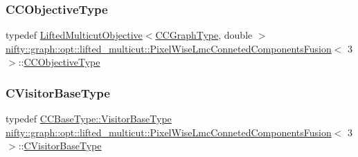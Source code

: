 \subsubsection{\texorpdfstring{C\+C\+Objective\+Type}{CCObjectiveType}}
{\footnotesize\ttfamily typedef \hyperlink{classnifty_1_1graph_1_1opt_1_1lifted__multicut_1_1LiftedMulticutObjective}{Lifted\+Multicut\+Objective}$<$\hyperlink{classnifty_1_1graph_1_1opt_1_1lifted__multicut_1_1PixelWiseLmcConnetedComponentsFusion_3_013_01_4_abbfd6800c04cc256d689973355268452}{C\+C\+Graph\+Type}, double $>$ \hyperlink{classnifty_1_1graph_1_1opt_1_1lifted__multicut_1_1PixelWiseLmcConnetedComponentsFusion}{nifty\+::graph\+::opt\+::lifted\+\_\+multicut\+::\+Pixel\+Wise\+Lmc\+Conneted\+Components\+Fusion}$<$ 3 $>$\+::\hyperlink{classnifty_1_1graph_1_1opt_1_1lifted__multicut_1_1PixelWiseLmcConnetedComponentsFusion_3_013_01_4_a0373c065e49f38aceda0c6f950735270}{C\+C\+Objective\+Type}}

\mbox{\label{classnifty_1_1graph_1_1opt_1_1lifted__multicut_1_1PixelWiseLmcConnetedComponentsFusion_3_013_01_4_a0a547cb867f76b1fbee4a0c957c4dc96}} 
\subsubsection{\texorpdfstring{C\+Visitor\+Base\+Type}{CVisitorBaseType}}
{\footnotesize\ttfamily typedef \hyperlink{classnifty_1_1graph_1_1opt_1_1common_1_1SolverBase_ad9932afb08dd17d375de4b15da9ffaa6}{C\+C\+Base\+Type\+::\+Visitor\+Base\+Type} \hyperlink{classnifty_1_1graph_1_1opt_1_1lifted__multicut_1_1PixelWiseLmcConnetedComponentsFusion}{nifty\+::graph\+::opt\+::lifted\+\_\+multicut\+::\+Pixel\+Wise\+Lmc\+Conneted\+Components\+Fusion}$<$ 3 $>$\+::\hyperlink{classnifty_1_1graph_1_1opt_1_1lifted__multicut_1_1PixelWiseLmcConnetedComponentsFusion_3_013_01_4_a0a547cb867f76b1fbee4a0c957c4dc96}{C\+Visitor\+Base\+Type}}



